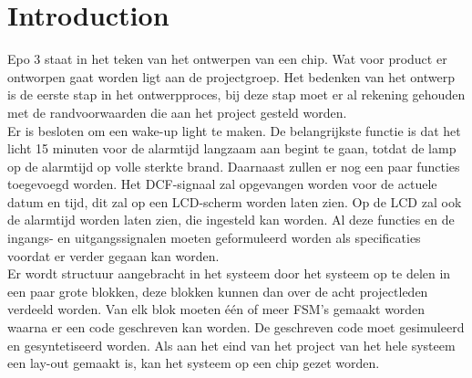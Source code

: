                                                                                                                                                                                                                                                                                                                                                                  \chapter{Introduction}
Epo 3 staat in het teken van het ontwerpen van een chip. Wat voor product er ontworpen gaat worden ligt aan de projectgroep. Het bedenken van het ontwerp is de eerste stap in het ontwerpproces, bij deze stap moet er al rekening gehouden met de randvoorwaarden die aan het project gesteld worden.\\
Er is besloten om een wake-up light te maken. De belangrijkste functie is dat het licht 15 minuten voor de alarmtijd langzaam aan begint te gaan, totdat de lamp op de alarmtijd op volle sterkte brand. Daarnaast zullen er nog een paar functies toegevoegd worden. Het DCF-signaal zal opgevangen worden voor de actuele datum en tijd, dit zal op een LCD-scherm worden laten zien. Op de LCD zal ook de alarmtijd worden laten zien, die ingesteld kan worden. Al deze functies en de ingangs- en uitgangssignalen moeten geformuleerd worden als specificaties voordat er verder gegaan kan worden.\\
Er wordt structuur aangebracht in het systeem door het systeem op te delen in een paar grote blokken, deze blokken kunnen dan over de acht projectleden verdeeld worden. Van elk blok moeten \'e\'en of meer FSM's gemaakt worden waarna er een code geschreven kan worden. De geschreven code moet gesimuleerd en gesyntetiseerd worden. Als aan het eind van het project van het hele systeem een lay-out gemaakt is, kan het systeem op een chip gezet worden.
